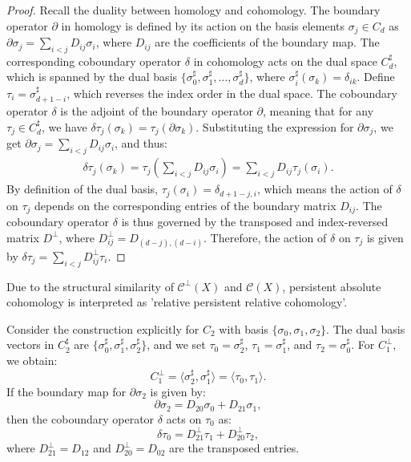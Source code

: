 \begin{proof}
Recall the duality between homology and cohomology. The boundary operator \( \partial \) in homology is defined by its action on the basis elements \( \sigma_j \in C_d \) as $\partial \sigma_j = \sum_{i < j} D_{ij} \sigma_i$, where \( D_{ij} \) are the coefficients of the boundary map. The corresponding coboundary operator \( \delta \) in cohomology acts on the dual space \( C_d^\sharp \), which is spanned by the dual basis \( \{\sigma_0^\sharp, \sigma_1^\sharp, \ldots, \sigma_d^\sharp\} \), where \( \sigma_i^\sharp(\sigma_k) = \delta_{ik} \). Define \( \tau_i = \sigma^\sharp_{d+1-i} \), which reverses the index order in the dual space. The coboundary operator \( \delta \) is the adjoint of the boundary operator \( \partial \), meaning that for any \( \tau_j \in C_d^\sharp \), we have $\delta \tau_j (\sigma_k) = \tau_j(\partial \sigma_k)$. Substituting the expression for \( \partial \sigma_j \), we get $\partial \sigma_j = \sum_{i < j} D_{ij} \sigma_i$, and thus:
\begin{align}
\delta \tau_j (\sigma_k) = \tau_j\left( \sum_{i < j} D_{ij} \sigma_i \right) = \sum_{i < j} D_{ij} \tau_j(\sigma_i).
\end{align}
By definition of the dual basis, \( \tau_j(\sigma_i) = \delta_{d+1-j,i} \), which means the action of \( \delta \) on \( \tau_j \) depends on the corresponding entries of the boundary matrix \( D_{ij} \). The coboundary operator \( \delta \) is thus governed by the transposed and index-reversed matrix \( D^\perp \), where $D_{ij}^\perp = D_{(d-j),(d-i)}$. Therefore, the action of \( \delta \) on \( \tau_j \) is given by $\delta \tau_j = \sum_{i < j} D_{ij}^\perp \tau_i$. \end{proof}

\begin{remark}{\cite[\S 2.7]{de2011dualities}}
Due to the structural similarity of \( \mathcal{C}^\perp(X) \) and \( \mathcal{C}(X) \), persistent absolute cohomology is interpreted as 'relative persistent relative cohomology'.
\end{remark}

\begin{example}
\label{chaincomplexcohomology}
Consider the construction explicitly for \( C_2 \) with basis \( \{\sigma_0, \sigma_1, \sigma_2\} \). The dual basis vectors in \( C_2^\sharp \) are \( \{\sigma_0^\sharp, \sigma_1^\sharp, \sigma_2^\sharp\} \), and we set \( \tau_0 = \sigma_2^\sharp \), \( \tau_1 = \sigma_1^\sharp \), and \( \tau_2 = \sigma_0^\sharp \). For \( C_1^\perp \), we obtain:
\[
	C_1^\perp = \langle \sigma_2^\sharp, \sigma_1^\sharp \rangle = \langle \tau_0, \tau_1 \rangle.
\]
If the boundary map for \( \partial \sigma_2 \) is given by:
\[
	\partial \sigma_2 = D_{20} \sigma_0 + D_{21} \sigma_1,
\]
then the coboundary operator \( \delta \) acts on \( \tau_0 \) as:
\[
	\delta \tau_0 = D_{21}^\perp \tau_1 + D_{20}^\perp \tau_2,
\]
where \( D_{21}^\perp = D_{12} \) and \( D_{20}^\perp = D_{02} \) are the transposed entries.
\end{example}

